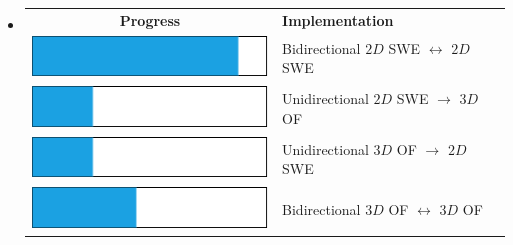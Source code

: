 

\begin{frame}
\begin{multicols}{2}
\begin{itemize}
\item<1->[]
{\renewcommand{\arraystretch}{2.5} %
\begin{table}[]
\begin{tabular}{ cl }
{\large\textbf{Progress}} & {\large\hspace{5pt} \textbf{Implementation}}\\
\includegraphics[scale=0.5]{./Resources/Images/bar1.png} & \hspace{5pt}Bidirectional $2D$ SWE $\leftrightarrow$ $2D$ SWE  \\
\includegraphics[scale=0.5]{./Resources/Images/bar2.png} &\hspace{5pt} Unidirectional $2D$ SWE $\rightarrow$ $3D$ OF \\
\includegraphics[scale=0.5]{./Resources/Images/bar2.png} &\hspace{5pt} Unidirectional $3D$ OF $\rightarrow$ $2D$ SWE \\
\includegraphics[scale=0.5]{./Resources/Images/bar3.png} & \hspace{5pt} Bidirectional $3D$ OF $\leftrightarrow$ $3D$ OF \\
\end{tabular}

\end{table}
}

\vfill\columnbreak


\end{itemize}
\end{multicols}
\end{frame}
